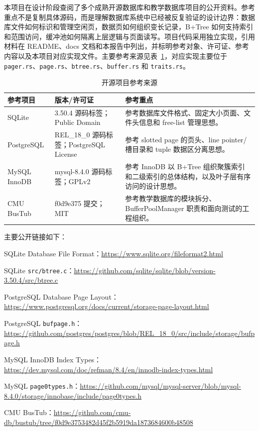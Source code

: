 \documentclass[UTF8,a4paper,12pt]{ctexart}
\newcommand{\code}[1]{\texttt{#1}}
\begin{document}
本项目在设计阶段查阅了多个成熟开源数据库和教学数据库项目的公开资料。参考重点不是复制具体源码，而是理解数据库系统中已经被反复验证的设计边界：数据库文件如何标识和管理空闲页，数据页如何组织变长记录，B+Tree 如何支持索引和范围访问，缓冲池如何隔离上层逻辑与页面读写。项目代码采用独立实现，引用材料在 README、docs 文档和本报告中列出，并标明参考对象、许可证、参考内容以及本项目对应实现文件。主要参考来源见表~\ref{tab:opensource}，对应实现主要位于 \code{pager.rs}、\code{page.rs}、\code{btree.rs}、\code{buffer.rs} 和 \code{traits.rs}。

\begin{table}[H]
\centering
\caption{开源项目参考来源}
\label{tab:opensource}
\small
\begin{tabularx}{\textwidth}{p{3.0cm}p{3.1cm}X}
\toprule
参考项目 & 版本/许可证 & 参考重点\\
\midrule
SQLite & 3.50.4 源码标签；Public Domain & 参考数据库文件格式、固定大小页面、文件头信息和 free-list 管理思想。\\
PostgreSQL & REL\_18\_0 源码标签；PostgreSQL License & 参考 slotted page 的页头、line pointer/槽目录和 tuple 数据区分离思想。\\
MySQL InnoDB & mysql-8.4.0 源码标签；GPLv2 & 参考 InnoDB 以 B+Tree 组织聚簇索引和二级索引的总体结构，以及叶子层有序访问的设计思想。\\
CMU BusTub & f0d9e375 提交；MIT & 参考教学数据库的模块拆分、BufferPoolManager 职责和面向测试的工程组织。\\
\bottomrule
\end{tabularx}
\normalsize
\end{table}

主要公开链接如下：

\begin{enumerate}[label={[\arabic*]},leftmargin=2.5em]
\item SQLite Database File Format：\url{https://www.sqlite.org/fileformat2.html}
\item SQLite \code{src/btree.c}：\url{https://github.com/sqlite/sqlite/blob/version-3.50.4/src/btree.c}
\item PostgreSQL Database Page Layout：\url{https://www.postgresql.org/docs/current/storage-page-layout.html}
\item PostgreSQL \code{bufpage.h}：\url{https://github.com/postgres/postgres/blob/REL_18_0/src/include/storage/bufpage.h}
\item MySQL InnoDB Index Types：\url{https://dev.mysql.com/doc/refman/8.4/en/innodb-index-types.html}
\item MySQL \code{page0types.h}：\url{https://github.com/mysql/mysql-server/blob/mysql-8.4.0/storage/innobase/include/page0types.h}
\item CMU BusTub：\url{https://github.com/cmu-db/bustub/tree/f0d9e3753482d45f2b5919da1873684600b48508}
\end{enumerate}
\end{document}
